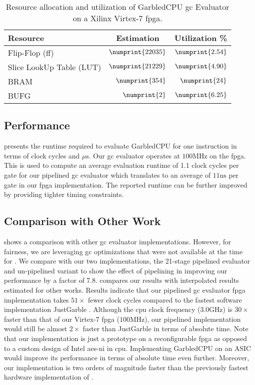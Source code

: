 \begin{table}[ht]
\centering
\caption{Resource allocation and utilization of GarbledCPU \acrshort{gc} Evaluator on a Xilinx Virtex-7 \acrshort{fpga}.}
\label{table:resource}
\begin{tabular}{l|r|r}
Resource    & \multicolumn{1}{c|}{Estimation} & \multicolumn{1}{c}{Utilization \%} \\ \hline \hline
Flip-Flop (\acrshort{ff}) & $\numprint{22035}$ & $\numprint{2.54}$ \\ \hline
Slice LookUp Table (LUT) & $\numprint{21229}$ & $\numprint{4.90}$ \\ \hline
BRAM & $\numprint{354}$ & $\numprint{24}$
\\ \hline
BUFG & $\numprint{2}$ & $\numprint{6.25}$
 \end{tabular}
\end{table}

\subsection{Performance}  presents the runtime required to evaluate GarbledCPU for one instruction in terms of clock cycles and $\mu\textrm{s}$. Our \acrshort{gc} evaluator operates at $100\textrm{MHz}$ on the \acrshort{fpga}. This is used to compute an average evaluation runtime of 1.1 clock cycles per gate for our pipelined \acrshort{gc} evaluator which translates to an average of $11\textrm{ns}$ per gate in our \acrshort{fpga} implementation. The reported runtime can be further improved by providing tighter timing constraints.

\subsection{Comparison with Other Work}
 shows a comparison with other \acrshort{gc} evaluator implementations. However, for fairness, we are leveraging \acrshort{gc} optimizations that were not available at the time for \cite{jarvinen2010garbled}. We compare with our two implementations, the 21-stage pipelined evaluator and un-pipelined variant to show the effect of pipelining in improving our performance by a factor of 7.8.  compares our results with interpolated results estimated for other works. Results indicate that our pipelined \acrshort{gc} evaluator \acrshort{fpga} implementation takes $51\times$ fewer clock cycles compared to the fastest software implementation JustGarble \cite{bellare2013efficient}. Although the \acrshort{cpu} clock frequency ($3.0\textrm{GHz}$) is $30\times$ faster than that of our Virtex-7 \acrshort{fpga} ($100\textrm{MHz}$), our pipelined implementation would still be almost $2\times$ faster than JustGarble in terms of absolute time. Note that our implementation is just a prototype on a reconfigurable \acrshort{fpga} as opposed to a custom design of Intel \acrshort{aes-ni} in \acrshort{cpu}. Implementing GarbledCPU on an ASIC would improve its performance in terms of absolute time even further. Moreover, our implementation is two orders of magnitude faster than the previously fastest hardware implementation of \cite{jarvinen2010garbled}.

